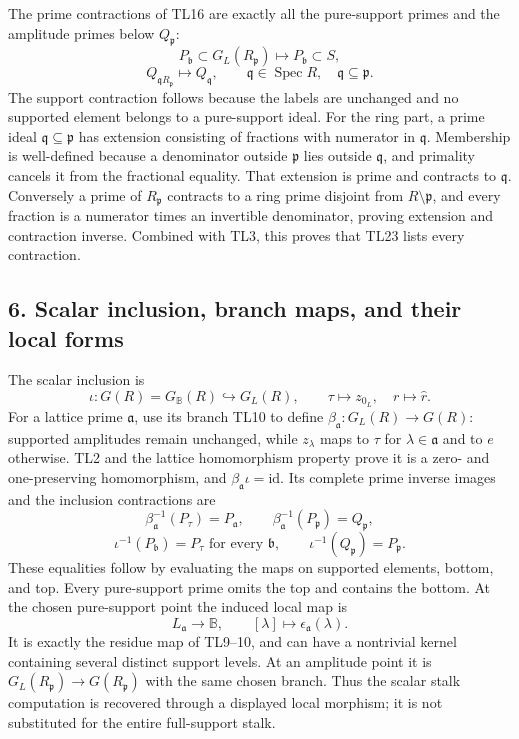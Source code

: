The prime contractions of TL16 are exactly all the pure-support primes
and the amplitude primes below \(Q_{\mathfrak p}\): \[
 P_{\mathfrak b}\subset G_L(R_{\mathfrak p})\longmapsto P_{\mathfrak b}\subset S,
\] \[
 Q_{\mathfrak qR_{\mathfrak p}}\longmapsto Q_{\mathfrak q},
 \qquad\mathfrak q\in\operatorname{Spec}R,\quad\mathfrak q\subseteq\mathfrak p.
 \tag{TL23}
\] The support contraction follows because the labels are unchanged and
no supported element belongs to a pure-support ideal. For the ring part,
a prime ideal \(\mathfrak q\subseteq\mathfrak p\) has extension
consisting of fractions with numerator in \(\mathfrak q\). Membership is
well-defined because a denominator outside \(\mathfrak p\) lies outside
\(\mathfrak q\), and primality cancels it from the fractional equality.
That extension is prime and contracts to \(\mathfrak q\). Conversely a
prime of \(R_{\mathfrak p}\) contracts to a ring prime disjoint from
\(R\setminus\mathfrak p\), and every fraction is a numerator times an
invertible denominator, proving extension and contraction inverse.
Combined with TL3, this proves that TL23 lists every contraction.

\subsection{6. Scalar inclusion, branch maps, and their local
forms}\label{scalar-inclusion-branch-maps-and-their-local-forms}

The scalar inclusion is \[
 \iota:G(R)=G_{\mathbb B}(R)\hookrightarrow G_L(R),\qquad
 \tau\mapsto z_{0_L},\quad r\mapsto\widehat r.
 \tag{TL24}
\] For a lattice prime \(\mathfrak a\), use its branch TL10 to define
\(\beta_{\mathfrak a}:G_L(R)\to G(R)\): supported amplitudes remain
unchanged, while \(z_\lambda\) maps to \(\tau\) for
\(\lambda\in\mathfrak a\) and to \(e\) otherwise. TL2 and the lattice
homomorphism property prove it is a zero- and one-preserving
homomorphism, and \(\beta_{\mathfrak a}\iota=\mathrm{id}\). Its complete
prime inverse images and the inclusion contractions are \[
 \beta_{\mathfrak a}^{-1}(P_\tau)=P_{\mathfrak a},\qquad
 \beta_{\mathfrak a}^{-1}(P_{\mathfrak p})=Q_{\mathfrak p},
\] \[
 \iota^{-1}(P_{\mathfrak b})=P_\tau\text{ for every }\mathfrak b,
 \qquad\iota^{-1}(Q_{\mathfrak p})=P_{\mathfrak p}.
 \tag{TL25}
\] These equalities follow by evaluating the maps on supported elements,
bottom, and top. Every pure-support prime omits the top and contains the
bottom. At the chosen pure-support point the induced local map is \[
 L_{\mathfrak a}\longrightarrow\mathbb B,
 \qquad[\lambda]\mapsto\epsilon_{\mathfrak a}(\lambda).
 \tag{TL26}
\] It is exactly the residue map of TL9--10, and can have a nontrivial
kernel containing several distinct support levels. At an amplitude point
it is \(G_L(R_{\mathfrak p})\to G(R_{\mathfrak p})\) with the same
chosen branch. Thus the scalar stalk computation is recovered through a
displayed local morphism; it is not substituted for the entire
full-support stalk.

